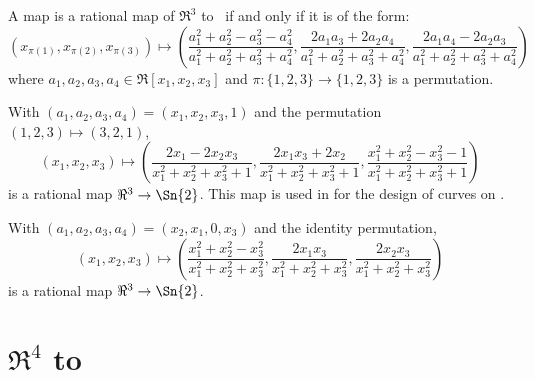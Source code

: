 
\begin{theorem}
\label{thm:n3}
A map is a rational map of $\Re^3$ to \ if and only if
it is of the form:
\[
(x_{\pi(1)},x_{\pi(2)},x_{\pi(3)}) \mapsto (\frac{a_1^2 + a_2^2 - a_3^2 - a_4^2}{a_1^2 + a_2^2 + a_3^2 + a_4^2},
		       \frac{2a_1a_3 + 2a_2a_4}{a_1^2 + a_2^2 + a_3^2 + a_4^2},
		       \frac{2a_1a_4 - 2a_2a_3}{a_1^2 + a_2^2 + a_3^2 + a_4^2})
\]
where $a_1,a_2,a_3,a_4 \in \Re[x_1,x_2,x_3]$
and $\pi : \{1,2,3\} \rightarrow \{1,2,3\}$ is a permutation.
\end{theorem}
%
\begin{example}
With $(a_1,a_2,a_3,a_4) = (x_1,x_2,x_3,1)$
and the permutation $(1,2,3) \mapsto (3,2,1)$,
\[
(x_1,x_2,x_3) \mapsto 
(\frac{2x_1 - 2x_2x_3}{x_1^2 + x_2^2 + x_3^2 + 1},
 \frac{2x_1x_3 + 2x_2}{x_1^2 + x_2^2 + x_3^2 + 1},
 \frac{x_1^2 + x_2^2 - x_3^2 - 1}{x_1^2 + x_2^2 + x_3^2 + 1})
\]
is a rational map $\Re^3 \rightarrow \Sn{2}$.
This map is used in \cite{dietz93} 
for the design of curves on .
\end{example}
%
\begin{example}
\label{eg:foreshadow}
With $(a_1,a_2,a_3,a_4)=(x_2,x_1,0,x_3)$ and the identity permutation,
\[
(x_1,x_2,x_3) \mapsto 
(\frac{x_1^2 + x_2^2 - x_3^2}{x_1^2 + x_2^2 + x_3^2},
 \frac{2x_1x_3}{x_1^2 + x_2^2 + x_3^2},
 \frac{2x_2x_3}{x_1^2 + x_2^2 + x_3^2})
\]
is a rational map $\Re^3 \rightarrow \Sn{2}$.
\end{example}

\vspace{.5in}

\section{$\Re^{4}$ to }
\label{sec:n4}


